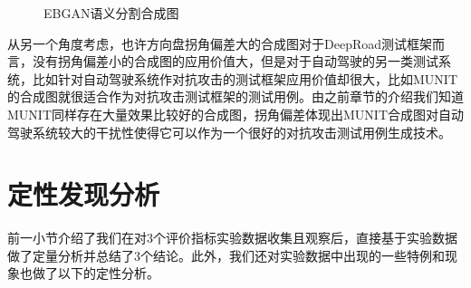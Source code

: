 \begin{enumerate}[itemindent=40pt, listparindent = 0.7cm, label={发现\arabic*:}]
    \begin{figure}[h]
        \centering
        \caption{EBGAN语义分割合成图}
        \label{fig:seg}
    \end{figure}

    从另一个角度考虑，也许方向盘拐角偏差大的合成图对于DeepRoad测试框架而言，没有拐角偏差小的合成图的应用价值大，但是对于自动驾驶的另一类测试系统，比如针对自动驾驶系统作对抗攻击的测试框架应用价值却很大，比如MUNIT的合成图就很适合作为对抗攻击测试框架的测试用例。由之前章节的介绍我们知道MUNIT同样存在大量效果比较好的合成图，拐角偏差体现出MUNIT合成图对自动驾驶系统较大的干扰性使得它可以作为一个很好的对抗攻击测试用例生成技术。　
\end{enumerate}

\section{定性发现分析}

前一小节介绍了我们在对3个评价指标实验数据收集且观察后，直接基于实验数据做了定量分析并总结了3个结论。此外，我们还对实验数据中出现的一些特例和现象也做了以下的定性分析。

